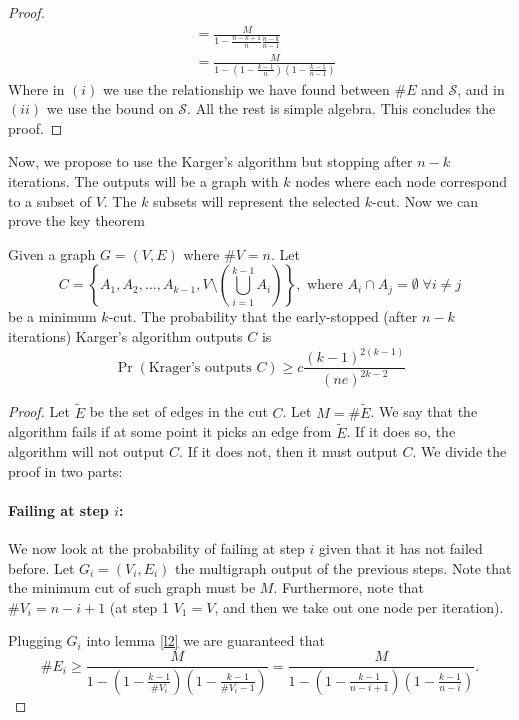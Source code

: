 \documentclass[11pt]{article}
\begin{document}
\begin{enumerate}
\begin{proof}
\begin{align*}
            &=\frac{M}{1-\frac{n-k+1}{n}\frac{n-k}{n-1}}\\
            &= \frac{M}{1-\left(1-\frac{k-1}{n}\right)\left(1-\frac{k-1}{n-1}\right)}
        \end{align*}
        Where in $(i)$ we use the relationship we have found between $\#E$ and $\mathcal{S}$, and in $(ii)$ we use the bound on $\mathcal{S}$. All the rest is simple algebra. This concludes the proof.
    \end{proof}
    Now, we propose to use the Karger's algorithm but stopping after $n-k$ iterations. The outputs will be a graph with $k$ nodes where each node correspond to a subset of $V$. The $k$ subsets will represent the selected $k$-cut. Now we can prove the key theorem
    \begin{theorem}\label{th1} Given a graph $G=(V,E)$ where $\#V = n$. Let 
    \begin{equation*}
        C = \left\{A_1, A_2,\dots, A_{k-1}, V\setminus\left(\bigcup_{i=1}^{k-1}A_i\right)\right\}, \text{ where } A_i\cap A_j = \emptyset\; \forall i \neq j
    \end{equation*}  
        be a minimum $k$-cut. The probability that the early-stopped (after $n-k$ iterations) Karger's algorithm outputs $C$ is 
        \begin{equation*}
            \Pr\left(\text{Krager's outputs } C\right)\geq c\frac{(k-1)^{2(k-1)}}{(ne)^{2k-2}}
        \end{equation*}
    \end{theorem}
    \begin{proof}
        Let $\tilde E$ be the set of edges in the cut $C$. Let $M = \#\tilde E$. We say that the algorithm fails if at some point it picks an edge from $\tilde E$. If it does so, the algorithm will not output $C$. If it does not, then it must output $C$. We divide the proof in two parts:
        \paragraph*{Failing at step $i$:}We now look at the probability of failing at step $i$ given that it has not failed before. Let $G_i = (V_i,E_i)$ the multigraph output of the previous steps. Note that the minimum cut of such graph must be $M$. Furthermore, note that $\#V_i=n-i+1$ (at step 1 $V_1 = V$, and then we take out one node per iteration).
        
        Plugging $G_i$ into lemma \ref{l2} we are guaranteed that
        \begin{equation*}
            \# E_i \geq \frac{M}{1-\left(1-\frac{k-1}{\#V_i}\right)\left(1-\frac{k-1}{\#V_i-1}\right)} = \frac{M}{1-\left(1-\frac{k-1}{n-i+1}\right)\left(1-\frac{k-1}{n-i}\right)}.
        \end{equation*}


\end{proof}
\end{enumerate}
\end{document}
